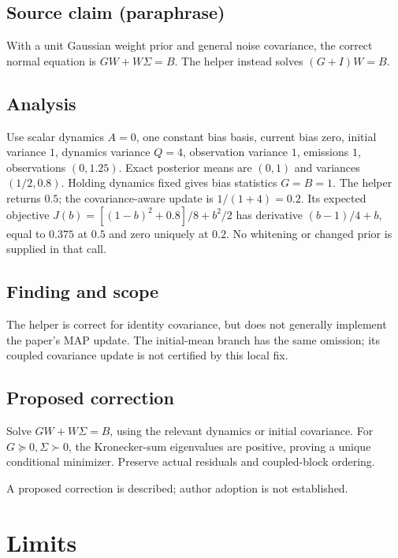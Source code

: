 \documentclass[11pt]{article}
\begin{document}
\subsection*{Source claim (paraphrase)}

With a unit Gaussian weight prior and general noise covariance, the correct normal equation is \(GW+W\Sigma=B\). The helper instead solves \((G+I)W=B\).

\subsection*{Analysis}

Use scalar dynamics \(A=0\), one constant bias basis, current bias zero, initial variance \(1\), dynamics variance \(Q=4\), observation variance \(1\), emissions \(1\), observations \((0,1.25)\). Exact posterior means are \((0,1)\) and variances \((1/2,0.8)\). Holding dynamics fixed gives bias statistics \(G=B=1\). The helper returns \(0.5\); the covariance-aware update is \(1/(1+4)=0.2\). Its expected objective \(J(b)=[(1-b)^2+0.8]/8+b^2/2\) has derivative \((b-1)/4+b\), equal to \(0.375\) at \(0.5\) and zero uniquely at \(0.2\). No whitening or changed prior is supplied in that call.

\subsection*{Finding and scope}

The helper is correct for identity covariance, but does not generally implement the paper’s MAP update. The initial-mean branch has the same omission; its coupled covariance update is not certified by this local fix.

\subsection*{Proposed correction}

Solve \(GW+W\Sigma=B\), using the relevant dynamics or initial covariance. For \(G\succeq0,\Sigma\succ0\), the Kronecker-sum eigenvalues are positive, proving a unique conditional minimizer. Preserve actual residuals and coupled-block ordering.

A proposed correction is described; author adoption is not established.

\section*{Limits}
\end{document}
